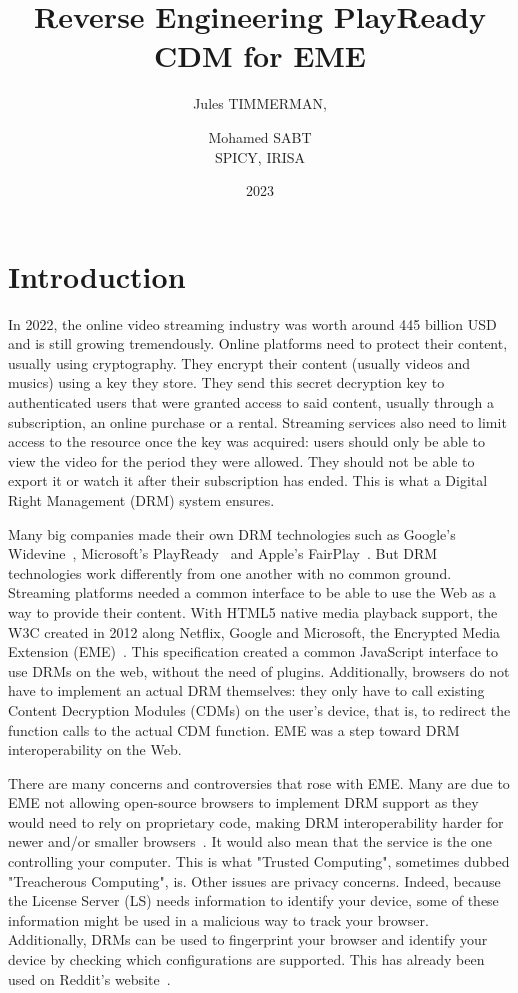 \documentclass[11pt, a4paper]{IEEEtran}
\title{Reverse Engineering PlayReady CDM for EME}
\date{2023}
\author{Jules TIMMERMAN, \and Mohamed SABT\\SPICY, IRISA}
\begin{document}
\maketitle

\section{Introduction}

In 2022, the online video streaming industry was worth around 445 billion USD~\cite{business} and is still growing tremendously. Online platforms need to protect their content, usually using cryptography. They encrypt their content (usually videos and musics) using a key they store. They send this secret decryption key to authenticated users that were granted access to said content, usually through a subscription, an online purchase or a rental. Streaming services also need to limit access to the resource once the key was acquired: users should only be able to view the video for the period they were allowed. They should not be able to export it or watch it after their subscription has ended. This is what a Digital Right Management (DRM) system ensures.

Many big companies made their own DRM technologies such as Google's Widevine~\cite{widevine}, Microsoft's PlayReady~\cite{playready} and Apple's FairPlay~\cite{fairplay}. But DRM technologies work differently from one another with no common ground. Streaming platforms needed a common interface to be able to use the Web as a way to provide their content. With HTML5 native media playback support, the W3C created in 2012 along Netflix, Google and Microsoft, the Encrypted Media Extension (EME)~\cite{EME}. This specification created a common JavaScript interface to use DRMs on the web, without the need of plugins. Additionally, browsers do not have to implement an actual DRM themselves: they only have to call existing Content Decryption Modules (CDMs) on the user's device, that is, to redirect the function calls to the actual CDM function. EME was a step toward DRM interoperability on the Web.

There are many concerns and controversies that rose with EME. Many are due to EME not allowing open-source browsers to implement DRM support as they would need to rely on proprietary code, making DRM interoperability harder for newer and/or smaller browsers~\cite{effobjection}. It would also mean that the service is the one controlling your computer. This is what "Trusted Computing", sometimes dubbed "Treacherous Computing", is. Other issues are privacy concerns. Indeed, because the License Server (LS) needs information to identify your device, some of these information might be used in a malicious way to track your browser. Additionally, DRMs can be used to fingerprint your browser and identify your device by checking which configurations are supported. This has already been used on Reddit's website~\cite{reddit}. 
\end{document}
